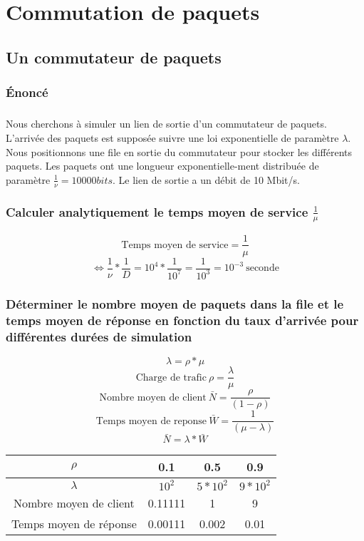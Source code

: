 
\chapter{Commutation de paquets}
    \section{Un commutateur de paquets}
        \subsection{Énoncé}
            \paragraph{}
Nous cherchons à simuler un lien de sortie d'un commutateur de paquets.
L'arrivée des paquets est supposée suivre une loi exponentielle de paramètre $\lambda$.
Nous positionnons une file en sortie du commutateur pour stocker les différents paquets.
Les paquets ont une longueur exponentielle-ment distribuée de paramètre $\frac{1}{\nu} = 10 000 bits$.
Le lien de sortie a un débit de 10 Mbit/s.
%
        \subsection{Calculer analytiquement le temps moyen de service $\frac{1}{\mu}$}
\[  \text{Temps moyen de service} = \frac{1}{\mu} \]
\[ \iff \frac{1}{\nu} * \frac{1}{D} = 10^{4} * \frac{1}{10^{7}} = \frac{1}{10^{3}} = 10^{-3} \ \text{seconde} \]
%
        \subsection{Déterminer le nombre moyen de paquets dans la file et le temps moyen de réponse en fonction du taux d'arrivée pour différentes durées de simulation}
\[  \lambda = \rho * \mu \]
\[  \text{Charge de trafic} \ \rho = \frac{\lambda}{\mu} \]
\[  \text{Nombre moyen de client} \ \bar{N} = \frac{\rho}{(1 - \rho)} \]
\[  \text{Temps moyen de reponse} \ \bar{W} = \frac{1}{(\mu - \lambda)} \]
\[  \bar{N} = \lambda * \bar{W} \]
\begin{tabular}{ | c | c| c | c | }
\hline
    $\rho$ & 0.1 & 0.5 & 0.9 \\
\hline
    $\lambda$ & $10^{2}$ & $5*10^{2}$ & $9*10^{2}$ \\
\hline
    Nombre moyen de client & 0.11111 & 1 & 9 \\
\hline
    Temps moyen de réponse & 0.00111 & 0.002 & 0.01 \\
\hline
\end{tabular}
%
